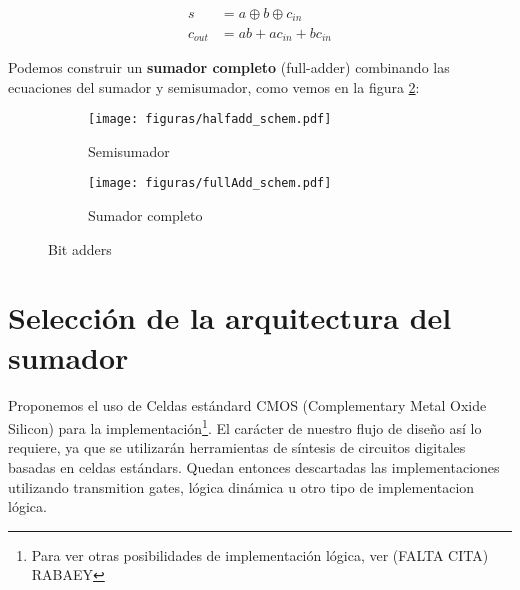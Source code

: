 \begin{subequations}
\begin{align}
s &= a\oplus b \oplus c_{in}
\label{s}
\\
c_{out}&= a b + a c_{in} + b c_{in}
\label{c}
\end{align}
\end{subequations}

Podemos construir un {\bf sumador completo} (full-adder) combinando las ecuaciones del sumador y semisumador, como vemos en la figura \ref{fig:fulladder}:

\vspace{-1pt}

\begin{figure}[h]
  \centering
\hspace{-23pt}
\begin{subfigure}[b]{0.3\textwidth}
                \centering
                \texttt{[image: figuras/halfadd\_schem.pdf]}
                \caption{Semisumador}
                \label{fig:halfadder}
        \end{subfigure}
\begin{subfigure}[b]{0.5\textwidth}
                \centering
                \texttt{[image: figuras/fullAdd\_schem.pdf]}
                \caption{Sumador completo}
                \label{fig:fulladder}
        \end{subfigure}

  \caption{Bit adders}\label{fig:bitadders}

\end{figure}

\vspace{0.5cm}



\section{Selección de la arquitectura del sumador}

Proponemos el uso de Celdas estándard CMOS (Complementary Metal Oxide Silicon) para la implementación\footnote{Para ver otras posibilidades de implementación lógica, ver (FALTA CITA) RABAEY}. El carácter de nuestro flujo de diseño así lo requiere, ya que se utilizarán herramientas de síntesis de circuitos digitales basadas en celdas estándars. Quedan entonces descartadas las implementaciones utilizando transmition gates, lógica dinámica u otro tipo de implementacion lógica.

